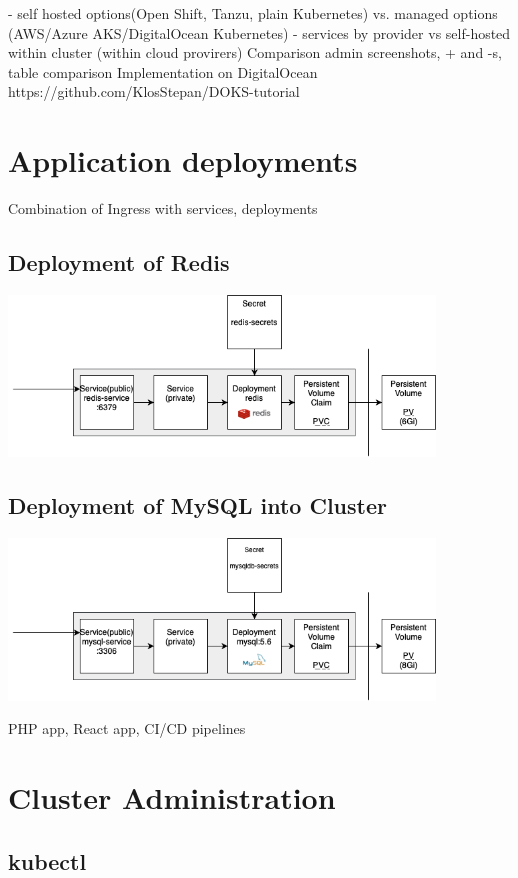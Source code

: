 \documentclass{article}
\begin{document}
- self hosted options(Open Shift, Tanzu, plain Kubernetes) vs. managed options (AWS/Azure AKS/DigitalOcean Kubernetes)
- services by provider vs self-hosted within cluster (within cloud provirers)
Comparison admin screenshots, + and -s, table comparison
Implementation on DigitalOcean https://github.com/KlosStepan/DOKS-tutorial
\section{Application deployments}
Combination of Ingress with services, deployments
\subsection{Deployment of Redis}
\begin{center}
  \includegraphics[width=0.850\textwidth]{redis-deployment.png}
\end{center}
\subsection{Deployment of MySQL into Cluster}
\begin{center}
  \includegraphics[width=0.850\textwidth]{mysql-deployment.png}
\end{center}
PHP app, React app, CI/CD pipelines
\section{Cluster Administration}
\subsection{kubectl}
\end{document}
